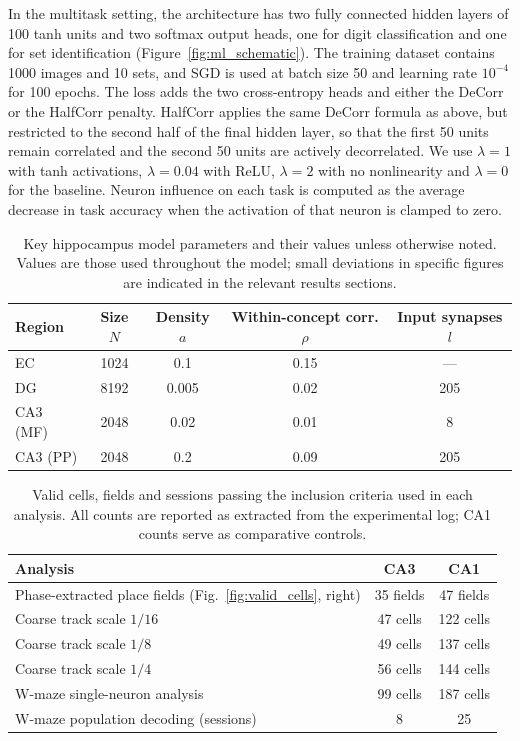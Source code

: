 \documentclass[11pt]{article}
\begin{document}
In the multitask setting, the architecture has two fully connected hidden
layers of 100 tanh units and two softmax output heads, one for digit
classification and one for set identification
(Figure~\ref{fig:ml_schematic}). The training dataset contains 1000 images
and 10 sets, and SGD is used at batch size 50 and learning rate $10^{-4}$
for 100 epochs. The loss adds the two cross-entropy heads and either the
DeCorr or the HalfCorr penalty. HalfCorr applies the same DeCorr formula as
above, but restricted to the second half of the final hidden layer, so that
the first 50 units remain correlated and the second 50 units are actively
decorrelated. We use $\lambda = 1$ with tanh activations, $\lambda = 0.04$
with ReLU, $\lambda = 2$ with no nonlinearity and $\lambda = 0$ for the
baseline. Neuron influence on each task is computed as the average decrease
in task accuracy when the activation of that neuron is clamped to zero.

\begin{table}[htbp]
\centering
\caption{Key hippocampus model parameters and their values unless otherwise
noted. Values are those used throughout the model; small deviations in
specific figures are indicated in the relevant results sections.}
\label{tab:params}
\begin{tabular}{lcccc}
\toprule
Region & Size $N$ & Density $a$ & Within-concept corr. $\rho$ & Input synapses $l$ \\
\midrule
EC & 1024 & 0.1 & 0.15 & --- \\
DG & 8192 & 0.005 & 0.02 & 205 \\
CA3 (MF) & 2048 & 0.02 & 0.01 & 8 \\
CA3 (PP) & 2048 & 0.2 & 0.09 & 205 \\
\bottomrule
\end{tabular}
\end{table}

\begin{table}[htbp]
\centering
\caption{Valid cells, fields and sessions passing the inclusion criteria
used in each analysis. All counts are reported as extracted from the
experimental log; CA1 counts serve as comparative controls.}
\label{tab:counts}
\begin{tabular}{lcc}
\toprule
Analysis & CA3 & CA1 \\
\midrule
Phase-extracted place fields (Fig.~\ref{fig:valid_cells}, right) & 35 fields & 47 fields \\
Coarse track scale $1/16$ & 47 cells & 122 cells \\
Coarse track scale $1/8$ & 49 cells & 137 cells \\
Coarse track scale $1/4$ & 56 cells & 144 cells \\
W-maze single-neuron analysis & 99 cells & 187 cells \\
W-maze population decoding (sessions) & 8 & 25 \\
\bottomrule
\end{tabular}
\end{table}
\end{document}
